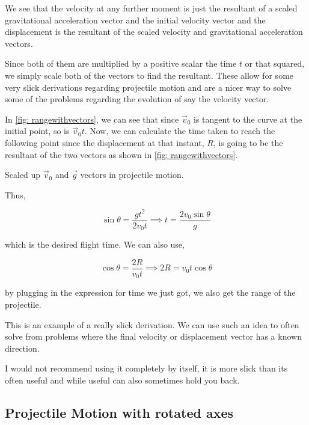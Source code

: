 We see that the velocity at any further moment is just the resultant of a scaled 
gravitational acceleration vector and the initial velocity vector and the displacement is the resultant of 
the scaled velocity and gravitational acceleration vectors. 

Since both of them are multiplied by a positive scalar the time \(t\) or that squared, we simply
scale both of the vectors to find the resultant. These allow for some very slick derivations regarding
projectile motion and are a nicer way to solve some of the problems regarding 
the evolution of say the velocity vector.

In \cref{fig: rangewithvectors}, we can see that since \(\vec{v}_0\) is tangent 
to the curve at the initial point, so is \(\vec{v}_0t\). Now, we can calculate 
the time taken to reach the following point since the displacement at that instant, 
\(R\), is going to be the resultant of the two vectors as shown in \cref{fig: rangewithvectors}.

\begin{marginfigure}
    \centering
    \caption{Scaled up \(\vec{v}_0\) and \(\vec{g}\) vectors in projectile motion.}
    \label{fig: rangewithvectors}
\end{marginfigure}

Thus,

\begin{equation*}
    \sin\theta = \frac{gt^2}{2v_0t} \implies t = \frac{2v_0\sin\theta}{g}
\end{equation*}

which is the desired flight time. We can also use,

\begin{equation*}
    \cos\theta = \frac{2R}{v_0t} \implies 2R = v_0t\cos\theta
\end{equation*}

by plugging in the expression for time we just got, we also get the range of the projectile. 

This is an example of a really slick derivation. We can use such an idea to often solve from 
problems where the final velocity or displacement vector has a known direction. 

I would not recommend using it completely by itself, it is more slick than its often useful
and while useful can also sometimes hold you back.

\subsection{Projectile Motion with rotated axes}

